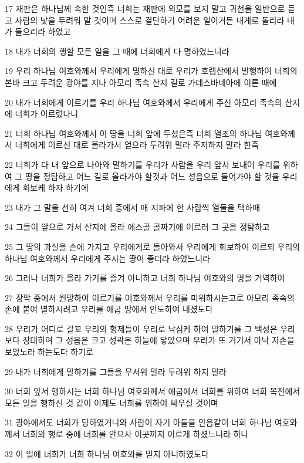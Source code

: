 \par 17 재판은 하나님께 속한 것인즉 너희는 재판에 외모를 보지 말고 귀천을 일반으로 듣고 사람의 낯을 두려워 말 것이며 스스로 결단하기 어려운 일이거든 내게로 돌리라 내가 들으리라 하였고
\par 18 내가 너희의 행할 모든 일을 그 때에 너희에게 다 명하였느니라
\par 19 우리 하나님 여호와께서 우리에게 명하신 대로 우리가 호렙산에서 발행하여 너희의 본바 크고 두려운 광야를 지나 아모리 족속 산지 길로 가데스바네아에 이른 때에
\par 20 내가 너희에게 이르기를 우리 하나님 여호와께서 우리에게 주신 아모리 족속의 산지에 너희가 이르렀나니
\par 21 너희 하나님 여호와께서 이 땅을 너희 앞에 두셨은즉 너희 열조의 하나님 여호와께서 너희에게 이르신 대로 올라가서 얻으라 두려워 말라 주저하지 말라 한즉
\par 22 너희가 다 내 앞으로 나아와 말하기를 우리가 사람을 우리 앞서 보내어 우리를 위하여 그 땅을 정탐하고 어느 길로 올라가야 할것과 어느 성읍으로 들어가야 할 것을 우리에게 회보케 하자 하기에
\par 23 내가 그 말을 선히 여겨 너희 중에서 매 지파에 한 사람씩 열둘을 택하매
\par 24 그들이 앞으로 가서 산지에 올라 에스골 골짜기에 이르러 그 곳을 정탐하고
\par 25 그 땅의 과실을 손에 가지고 우리에게로 돌아와서 우리에게 회보하여 이르되 우리의 하나님 여호와께서 우리에게 주시는 땅이 좋더라 하였느니라
\par 26 그러나 너희가 올라 가기를 즐겨 아니하고 너희 하나님 여호와의 명을 거역하여
\par 27 장막 중에서 원망하여 이르기를 여호와께서 우리를 미워하시는고로 아모리 족속의 손에 붙여 멸하시려고 우리를 애굽 땅에서 인도하여 내셨도다
\par 28 우리가 어디로 갈꼬 우리의 형제들이 우리로 낙심케 하여 말하기를 그 백성은 우리보다 장대하며 그 성읍은 크고 성곽은 하늘에 닿았으며 우리가 또 거기서 아낙 자손을 보았노라 하는도다 하기로
\par 29 내가 너희에게 말하기를 그들을 무서워 말라 두려워 하지 말라
\par 30 너희 앞서 행하시는 너희 하나님 여호와께서 애굽에서 너희를 위하여 너희 목전에서 모든 일을 행하신 것 같이 이제도 너희를 위하여 싸우실 것이며
\par 31 광야에서도 너희가 당하였거니와 사람이 자기 아들을 안음같이 너희 하나님 여호와께서 너희의 행로 중에 너희를 안으사 이곳까지 이르게 하셨느니라 하나
\par 32 이 일에 너희가 너희 하나님 여호와를 믿지 아니하였도다
